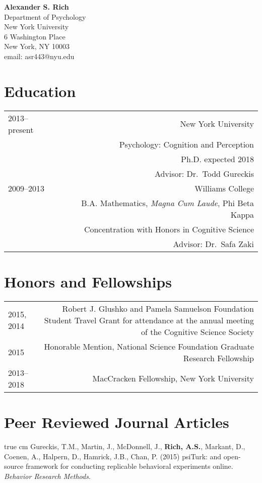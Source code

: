 \documentclass[12pt]{my_cv}
\def\ind{\hangindent=1 true cm\hangafter=1 \noindent}
\begin{document}
\noindent \textbf{\sffamily\Large Alexander S. Rich}\vspace{1em}\\
Department of Psychology\\
New York University\\
6 Washington Place\\
 New York, NY 10003\\
email: asr443@nyu.edu\\

\section{Education}
\begin{tabular}{L R}
2013--present&New York University\\
&Psychology: Cognition and Perception\\
&Ph.D. expected 2018\\
&Advisor: Dr.\ Todd Gureckis \vspace{1em}\\ 
2009--2013&Williams College\\
&B.A. Mathematics, \emph{Magna Cum Laude}, Phi Beta Kappa\\
&Concentration with Honors in Cognitive Science\\
&Advisor: Dr.\ Safa Zaki\\
\end{tabular}

\section{Honors and Fellowships}
\begin{tabular}{L R}
2015, 2014&Robert J. Glushko and Pamela Samuelson Foundation Student Travel Grant for attendance at the annual meeting of the Cognitive Science Society\\[1ex]
2015&Honorable Mention, National Science Foundation Graduate Research Fellowship\\[1ex]
2013--2018&MacCracken Fellowship, New York University\\
\end{tabular}

\section{Peer Reviewed Journal Articles}

\ind Gureckis, T.M., Martin, J., McDonnell, J., \textbf{Rich, A.S.}, Markant,
D., Coenen, A., Halpern, D., Hamrick, J.B., Chan, P. (2015) psiTurk: and
open-source framework for conducting replicable behavioral experiments online.
\emph{Behavior Research Methods}.
\end{document}
